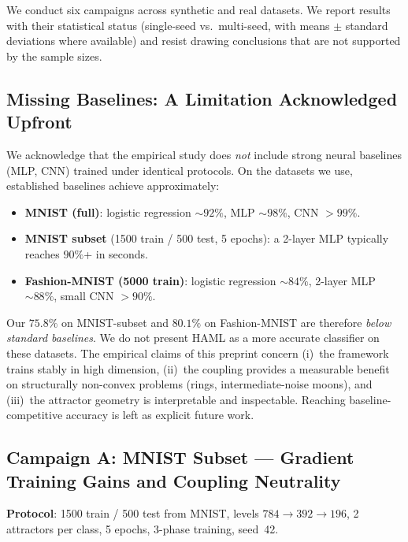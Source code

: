 \documentclass[11pt,a4paper]{article}
\begin{document}
We conduct six campaigns across synthetic and real datasets. We report results with
their statistical status (single-seed vs.\ multi-seed, with means $\pm$ standard
deviations where available) and resist drawing conclusions that are not supported by the
sample sizes.

\subsection{Missing Baselines: A Limitation Acknowledged Upfront}
\label{sec:emp:baselines}

We acknowledge that the empirical study does \emph{not} include strong neural baselines
(MLP, CNN) trained under identical protocols. On the datasets we use, established
baselines achieve approximately:
\begin{itemize}
  \item \textbf{MNIST (full)}: logistic regression $\sim 92\%$, MLP $\sim 98\%$,
        CNN $>99\%$.
  \item \textbf{MNIST subset} (1500 train / 500 test, 5 epochs): a 2-layer MLP typically
        reaches $90\%$+ in seconds.
  \item \textbf{Fashion-MNIST (5000 train)}: logistic regression $\sim 84\%$,
        2-layer MLP $\sim 88\%$, small CNN $>90\%$.
\end{itemize}
Our $75.8\%$ on MNIST-subset and $80.1\%$ on Fashion-MNIST are therefore \emph{below
standard baselines}. We do not present HAML as a more accurate classifier on these
datasets. The empirical claims of this preprint concern (i)~the framework trains stably
in high dimension, (ii)~the coupling provides a measurable benefit on structurally
non-convex problems (rings, intermediate-noise moons), and (iii)~the attractor geometry
is interpretable and inspectable. Reaching baseline-competitive accuracy is left as
explicit future work.

\subsection{Campaign A: MNIST Subset --- Gradient Training Gains and Coupling Neutrality}

\textbf{Protocol}: 1500 train / 500 test from MNIST, levels $784 \to 392 \to 196$,
2 attractors per class, 5 epochs, 3-phase training, seed~42.
\end{document}
